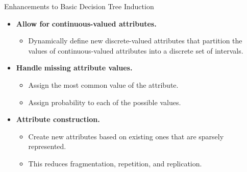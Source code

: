 \begin{frame}{Enhancements to Basic Decision Tree Induction}
	\begin{itemize}
		\item \textbf{Allow for} \textbf{\color{airforceblue}continuous-valued attributes.}
		      \begin{itemize}
			      \item Dynamically define new discrete-valued attributes that partition the values of continuous-valued attributes into a discrete set of intervals.
		      \end{itemize}
		\item \textbf{Handle} \textbf{\color{airforceblue}missing attribute values.}
		      \begin{itemize}
			      \item Assign the most common value of the attribute.
			      \item Assign probability to each of the possible values.
		      \end{itemize}
		\item \textbf{\color{airforceblue}Attribute construction.}
		      \begin{itemize}
			      \item Create new attributes based on existing ones that are sparsely represented.
			      \item This reduces fragmentation, repetition, and replication.
		      \end{itemize}
	\end{itemize}
\end{frame}

